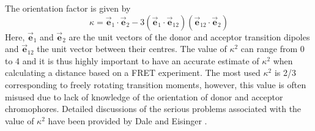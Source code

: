  The orientation factor is given by
\begin{equation}
 \kappa = \vec{\textbf{e}}_1\cdot\vec{\textbf{e}}_2 - 3(\vec{\textbf{e}}_1\cdot\vec{\textbf{e}}_{12})(\vec{\textbf{e}}_{12}\cdot\vec{\textbf{e}}_2)
 \label{eq:Kappa}
\end{equation}
 Here, $\vec{\textbf{e}}_1$ and $\vec{\textbf{e}}_2$ are the unit vectors of the donor and acceptor transition dipoles and $\vec{\textbf{e}}_{12}$ the unit vector between their centres. The value of $\kappa^2$ can range from 0 to 4 and it is thus highly important to have an accurate estimate of $\kappa^2$ when calculating a distance based on a FRET experiment. The most used $\kappa^2$ is 2/3 corresponding to freely rotating transition moments, however, this value is often misused due to lack of knowledge of the orientation of donor and acceptor chromophores. Detailed discussions of the serious problems associated with the value of $\kappa^2$ have been provided by Dale and Eisinger \cite{Dale1974,Dale1979}.

